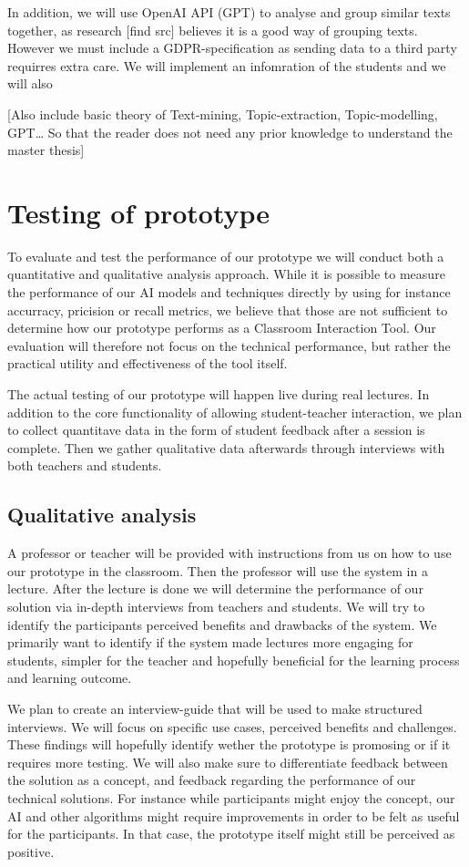 In addition, we will use OpenAI API (GPT) to analyse and group similar texts together, as research [find src] believes it is a good way of grouping texts. However we must include a GDPR-specification as sending data to a third party requirres extra care. We will implement an infomration of the students and we will also 

[Also include basic theory of Text-mining, Topic-extraction, Topic-modelling, GPT… So that the reader does not need any prior knowledge to understand the master thesis]



\section{Testing of prototype}
To evaluate and test the performance of our prototype we will conduct both a quantitative and qualitative analysis approach. While it is possible to measure the performance of our AI models and techniques directly by using for instance accurracy, pricision or recall metrics, we believe that those are not sufficient to determine how our prototype performs as a Classroom Interaction Tool. Our evaluation will therefore not focus on the technical performance, but rather the practical utility and effectiveness of the tool itself. 

The actual testing of our prototype will happen live during real lectures. In addition to the core functionality of allowing student-teacher interaction, we plan to collect quantitave data in the form of student feedback after a session is complete. Then we gather qualitative data afterwards through interviews with both teachers and students.


\subsection{Qualitative analysis}
A professor or teacher will be provided with instructions from us on how to use our prototype in the classroom. Then the professor will use the system in a lecture. After the lecture is done we will determine the performance of our solution via in-depth interviews from teachers and students. We will try to identify the participants perceived benefits and drawbacks of the system. We primarily want to identify if the system made lectures more engaging for students, simpler for the teacher and hopefully beneficial for the learning process and learning outcome.

We plan to create an interview-guide that will be used to make structured interviews. We will focus on specific use cases, perceived benefits and challenges. These findings will hopefully identify wether the prototype is promosing or if it requires more testing. We will also make sure to differentiate feedback between the solution as a concept, and feedback regarding the performance of our technical solutions. For instance while participants might enjoy the concept, our AI and other algorithms might require improvements in order to be felt as useful for the participants. In that case, the prototype itself might still be perceived as positive.


